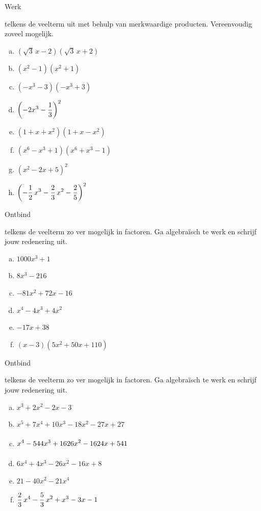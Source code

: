 \documentclass{ximera}
\begin{document}
\begin{Oefening}\setcounter{enumi}{2}
\hypertarget{oef4.2}{Werk} telkens de veelterm uit met behulp van merkwaardige producten. Vereenvoudig zoveel mogelijk. 
\begin{multicols}{2}
\begin{enumerate}[(a)]
\item
$(\sqrt{3}\,x-2)(\sqrt{3}\,x+2)$
\item
$(x^2-1)(x^2+1)$
\item
$(-x^3-3)(-x^3+3)$
\item
$\displaystyle \left(-2x^3-\frac{1}{3}\right)^2$
\item
$(1+x+x^2)(1+x-x^2)$
\item
$(x^6-x^3+1)(x^6+x^3-1)$
\item
$(x^2-2x+5)^2$
\item
$\displaystyle \left(-\frac{1}{2}\,x^3 - \frac{2}{3}\,x^2-\frac{2}{5}\right)^2$
\end{enumerate}
\end{multicols}
\end{Oefening}

\begin{Oefening}\setcounter{enumi}{3} 
\hypertarget{oef4.3}{Ontbind} telkens de veelterm zo ver mogelijk in factoren. Ga algebra\"isch te werk en schrijf jouw redenering uit.  
\begin{multicols}{2}
\begin{enumerate}[(a)]
\item
$1000 x^3 + 1$
\item
$8x^3-216$
\item
$-81x^2+72x-16$
\item
$x^4-4x^3+4x^2$
\item
$-17x+38$
\item
$(x-3)(5x^2+50x+110)$
\end{enumerate}
\end{multicols}
\end{Oefening}

\begin{Oefening}\setcounter{enumi}{4}
\hypertarget{oef4.4}{Ontbind} telkens de veelterm zo ver mogelijk in factoren. Ga algebra\"isch te werk en schrijf jouw redenering uit.  
\begin{multicols}{2}
\begin{enumerate}[(a)]
\item
$x^3+2x^2-2x-3$
\item
$x^5+7x^4+10x^3-18x^2-27x+27$
\item 
$\D x^4-544x^3+1626x^2-1624x+541 \mph{\frac{2}{3}}$
\item
$6x^4 + 4x^3 - 26x^2 - 16x + 8$
\item
$21-40x^2-21x^4$
\item
$\displaystyle \frac{2}{3}\,x^4-\frac{5}{3}\,x^2 + x^3 - 3x-1$
\end{enumerate}
\end{multicols}
\end{Oefening}
\end{document}
